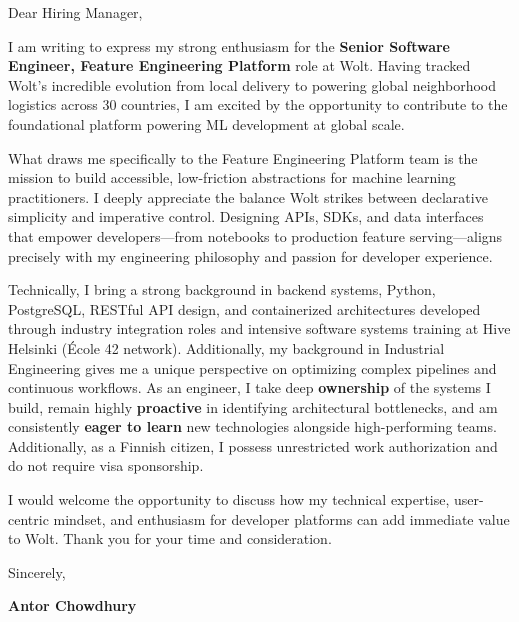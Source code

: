 \documentclass[a4paper,11pt]{article}
\begin{document}
\begin{justify}
Dear Hiring Manager,

I am writing to express my strong enthusiasm for the \textbf{Senior Software Engineer, Feature Engineering Platform} role at Wolt. Having tracked Wolt’s incredible evolution from local delivery to powering global neighborhood logistics across 30 countries, I am excited by the opportunity to contribute to the foundational platform powering ML development at global scale.

What draws me specifically to the Feature Engineering Platform team is the mission to build accessible, low-friction abstractions for machine learning practitioners. I deeply appreciate the balance Wolt strikes between declarative simplicity and imperative control. Designing APIs, SDKs, and data interfaces that empower developers—from notebooks to production feature serving—aligns precisely with my engineering philosophy and passion for developer experience.

Technically, I bring a strong background in backend systems, Python, PostgreSQL, RESTful API design, and containerized architectures developed through industry integration roles and intensive software systems training at Hive Helsinki (École 42 network). Additionally, my background in Industrial Engineering gives me a unique perspective on optimizing complex pipelines and continuous workflows. As an engineer, I take deep \textbf{ownership} of the systems I build, remain highly \textbf{proactive} in identifying architectural bottlenecks, and am consistently \textbf{eager to learn} new technologies alongside high-performing teams. Additionally, as a Finnish citizen, I possess unrestricted work authorization and do not require visa sponsorship.

I would welcome the opportunity to discuss how my technical expertise, user-centric mindset, and enthusiasm for developer platforms can add immediate value to Wolt. Thank you for your time and consideration.

\vspace{15pt}

Sincerely,

\vspace{10pt}

\textbf{Antor Chowdhury}
\end{justify}
\end{document}
